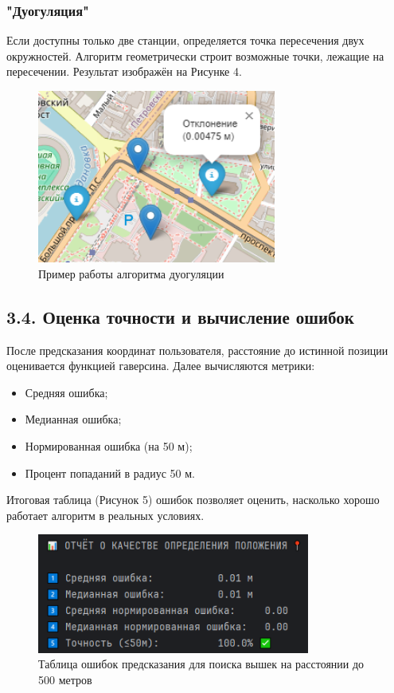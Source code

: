 \documentclass[a4paper,14pt]{extarticle}
\begin{document}
\begin{itemize}
    \subsubsection*{"Дуогуляция"}

    Если доступны только две станции, определяется точка пересечения двух окружностей.
    Алгоритм геометрически строит возможные точки, лежащие на пересечении.
    Результат изображён на Рисунке 4.
    \begin{figure}[H]
        \centering
        \includegraphics[width=0.7\textwidth]{dougulation.png}
        \caption{Пример работы алгоритма дуогуляции}
        \label{fig:duogulation_example}
    \end{figure}



    \subsection*{3.4. Оценка точности и вычисление ошибок}

    После предсказания координат пользователя, расстояние до истинной позиции оценивается функцией гаверсина.
    Далее вычисляются метрики:

    \begin{itemize}
        \item Средняя ошибка;
        \item Медианная ошибка;
        \item Нормированная ошибка (на 50 м);
        \item Процент попаданий в радиус 50 м.
    \end{itemize}

    Итоговая таблица (Рисунок 5) ошибок позволяет оценить,
    насколько хорошо работает алгоритм в реальных условиях.
    \begin{figure}[H]
        \centering
        \includegraphics[width=0.8\textwidth]{errors.png}
        \caption{Таблица ошибок предсказания для поиска вышек на расстоянии до 500 метров}
        \label{fig:errors_table}
    \end{figure}


\end{itemize}
\end{document}
